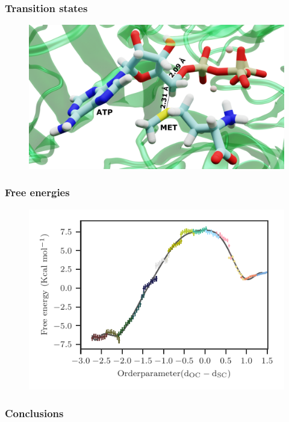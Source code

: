 \documentclass{beamer}
\begin{document}
\begin{frame}
\frametitle{Transition states}
\begin{figure}
\centering
\includegraphics[scale=0.1]{figures/mat2a-trans-labelled.png}
\end{figure}
\end{frame}
\begin{frame}
\frametitle{Free energies}
\begin{figure}
\includegraphics[scale=0.6]{figures/mat2a-fenergy.pdf}
\end{figure}
\end{frame}
\begin{frame}
\frametitle{Conclusions}

\end{frame}
\end{document}
